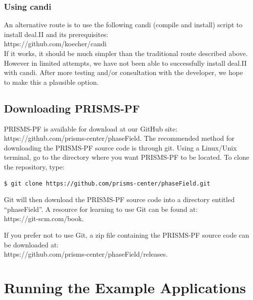 \documentclass[10pt]{article} %
\begin{document}
\subsubsection{Using candi}
An alternative route is to use the following candi (compile and install) script to install deal.II and its prerequisites: \\
https://github.com/koecher/candi \\

If it works, it should be much simpler than the traditional route described above. However in limited attempts, we have not been able to successfully install deal.II with candi. After more testing and/or consultation with the developer, we hope to make this a plausible option.

\subsection{Downloading PRISMS-PF}
PRISMS-PF is available for download at our GitHub site: https://github.com/prisms-center/phaseField. The recommended method for downloading the PRISMS-PF source code is through git. Using a Linux/Unix terminal, go to the directory where you want PRISMS-PF to be located. To clone the repository, type:
\begin{lstlisting}
$ git clone https://github.com/prisms-center/phaseField.git
\end{lstlisting}
Git will then download the PRISMS-PF source code into a directory entitled ``phaseField''. A resource for learning to use Git can be found at: \\https://git-scm.com/book.

If you prefer not to use Git, a zip file containing the PRISMS-PF source code can be downloaded at: \\https://github.com/prisms-center/phaseField/releases.

\section{Running the Example Applications}
\end{document}
